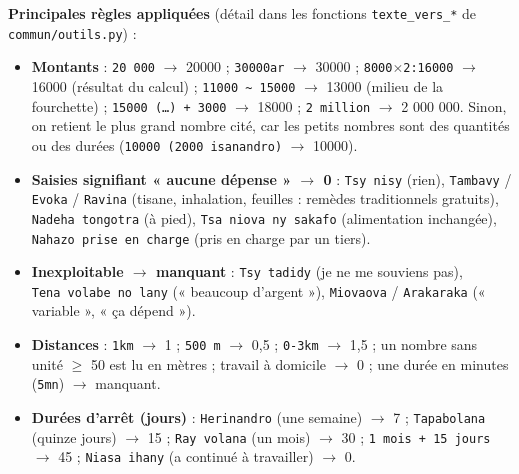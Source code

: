 \documentclass[

  french,

  10pt,

  a4paper,

]{article}
\providecommand{\tightlist}{%

  \setlength{\itemsep}{0pt}\setlength{\parskip}{0pt}}
\begin{document}
\textbf{Principales règles appliquées} (détail dans les fonctions \texttt{texte\_vers\_*} de \texttt{commun/outils.py}) :



\begin{itemize}

\tightlist

\item

  \textbf{Montants} : \texttt{20\ 000} \ensuremath{\rightarrow} 20000 ; \texttt{30000ar} \ensuremath{\rightarrow} 30000 ; \texttt{8000\ensuremath{\times}2:16000} \ensuremath{\rightarrow} 16000 (résultat du calcul) ; \texttt{11000\ \textasciitilde{}\ 15000} \ensuremath{\rightarrow} 13000 (milieu de la fourchette) ; \texttt{15000\ (\ldots{})\ +\ 3000} \ensuremath{\rightarrow} 18000 ; \texttt{2\ million} \ensuremath{\rightarrow} 2 000 000. Sinon, on retient le plus grand nombre cité, car les petits nombres sont des quantités ou des durées (\texttt{10000\ (2000\ isanandro)} \ensuremath{\rightarrow} 10000).

\item

  \textbf{Saisies signifiant « aucune dépense » \ensuremath{\rightarrow} 0} : \texttt{Tsy\ nisy} (rien), \texttt{Tambavy} / \texttt{Evoka} / \texttt{Ravina} (tisane, inhalation, feuilles : remèdes traditionnels gratuits), \texttt{Nadeha\ tongotra} (à pied), \texttt{Tsa\ niova\ ny\ sakafo} (alimentation inchangée), \texttt{Nahazo\ prise\ en\ charge} (pris en charge par un tiers).

\item

  \textbf{Inexploitable \ensuremath{\rightarrow} manquant} : \texttt{Tsy\ tadidy} (je ne me souviens pas), \texttt{Tena\ volabe\ no\ lany} (« beaucoup d'argent »), \texttt{Miovaova} / \texttt{Arakaraka} (« variable », « ça dépend »).

\item

  \textbf{Distances} : \texttt{1km} \ensuremath{\rightarrow} 1 ; \texttt{500\ m} \ensuremath{\rightarrow} 0,5 ; \texttt{0-3km} \ensuremath{\rightarrow} 1,5 ; un nombre sans unité \ensuremath{\geq} 50 est lu en mètres ; travail à domicile \ensuremath{\rightarrow} 0 ; une durée en minutes (\texttt{5mn}) \ensuremath{\rightarrow} manquant.

\item

  \textbf{Durées d'arrêt (jours)} : \texttt{Herinandro} (une semaine) \ensuremath{\rightarrow} 7 ; \texttt{Tapabolana} (quinze jours) \ensuremath{\rightarrow} 15 ; \texttt{Ray\ volana} (un mois) \ensuremath{\rightarrow} 30 ; \texttt{1\ mois\ +\ 15\ jours} \ensuremath{\rightarrow} 45 ; \texttt{Niasa\ ihany} (a continué à travailler) \ensuremath{\rightarrow} 0.


\end{itemize}
\end{document}
